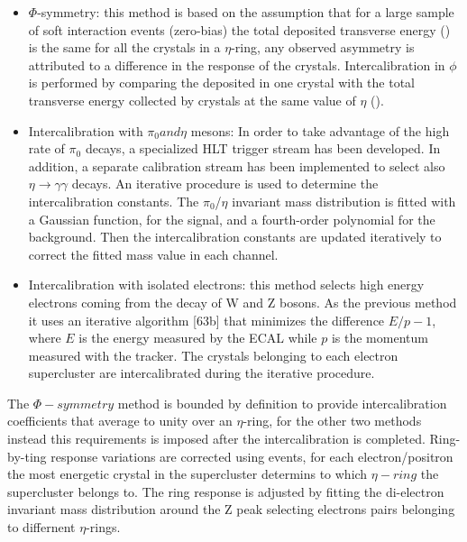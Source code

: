 \begin{itemize}
\item $\Phi$-symmetry: this method is based on the assumption that for a large sample of soft interaction
events (zero-bias) the total deposited transverse energy (\sumEt) is the same for all the crystals in a
$\eta$-ring, any observed asymmetry is attributed to a difference in the response of the crystals.
Intercalibration in $\phi$ is performed by comparing the \sumEt deposited in one crystal
with the total transverse energy collected by crystals at the same value of $\eta$ (\sumEtring).

\item Intercalibration with $\pi_0 and \eta$ mesons:
  In order to take advantage of the high rate of $\pi_0$ decays, a specialized HLT trigger stream has
been developed. In addition, a separate calibration stream has been implemented to select also
$\eta\to\gamma\gamma$ decays. An iterative procedure is used to determine the intercalibration constants.
The $\pi_0$/$\eta$ invariant mass distribution is fitted with a Gaussian function, for the signal, and a
fourth-order polynomial for the background. Then the intercalibration constants are updated
iteratively to correct the fitted mass value in each channel.

\item Intercalibration with isolated electrons: this method selects high energy electrons coming from the decay of
  W and Z bosons. As the previous method it uses an iterative algorithm [63b] that minimizes the difference $E/p - 1$,
  where $E$ is the energy measured by the ECAL while $p$ is the momentum measured with the tracker.
  The crystals belonging to each electron supercluster are intercalibrated during the iterative procedure.
\end{itemize}

The $\Phi-symmetry$ method is bounded by definition to provide intercalibration coefficients that average to unity
over an $\eta$-ring, for the other two methods instead this requirements is imposed after the intercalibration is completed.
Ring-by-ting response variations are corrected using \Zee events, for each electron/positron the most energetic crystal in the
supercluster determins to which $\eta-ring$ the supercluster belongs to. The ring response is adjusted by fitting the di-electron
invariant mass distribution around the Z peak selecting electrons pairs belonging to differnent $\eta$-rings.

